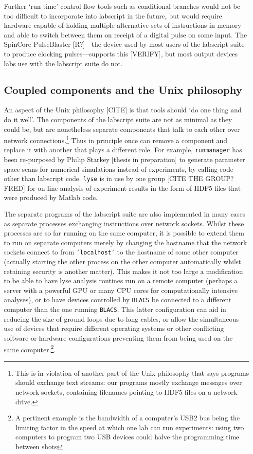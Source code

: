 Further `run-time' control flow tools such as conditional branches would not be too difficult to incorporate into labscript in the future, but would require hardware capable of holding multiple alternative sets of instructions in memory and able to switch between them on receipt of a digital pulse on some input. The SpinCore PulseBlaster [R?]---the device used by most users of the labscript suite to produce clocking pulses---supports this [VERIFY], but most output devices labs use with the labscript suite do not.

\subsection{Coupled components and the Unix philosophy}

An aspect of the Unix philosophy [CITE] is that tools should `do one thing and do it well'. The components of the labscript suite are not as minimal as they could be, but are nonetheless separate components that talk to each other over network connections.\footnote{This is in violation of another part of the Unix philosophy that says programs should exchange text streams: our programs mostly exchange messages over network sockets, containing filenames pointing to HDF5 files on a network drive.} Thus in principle once can remove a component and replace it with another that plays a different role. For example, \texttt{runmanager} has been re-purposed by Philip Starkey [thesis in preparation] to generate parameter space scans for numerical simulations instead of experiments, by calling code other than labscript code. \texttt{lyse} is in use by one group [CITE THE GROUP? FRED] for on-line analysis of experiment results in the form of HDF5 files that were produced by Matlab code.

The separate programs of the labscript suite are also implemented in many cases as separate processes exchanging instructions over network sockets. Whilst these processes are so far running on the same computer, it is possible to extend them to run on separate computers merely by changing the hostname that the network sockets connect to from \texttt{'localhost'} to the hostname of some other computer (actually starting the other process on the other computer automatically whilst retaining security is another matter). This makes it not too large a modification to be able to have lyse analysis routines run on a remote computer (perhaps a server with a powerful GPU or many CPU cores for computationally intensive analyses), or to have devices controlled by \texttt{BLACS} be connected to a different computer than the one running \texttt{BLACS}. This latter configuration can aid in reducing the size of ground loops due to long cables, or allow the simultaneous use of devices that require different operating systems or other conflicting software or hardware configurations preventing them from being used on the same computer.\footnote{A pertinent example is the bandwidth of a computer's USB2 bus being the limiting factor in the speed at which one lab can run experiments: using two computers to program two USB devices could halve the programming time between shots}.

